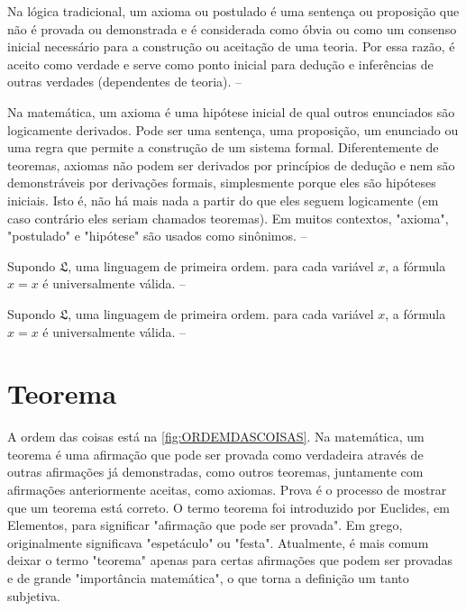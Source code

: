 Na lógica tradicional, um axioma ou postulado é uma sentença ou proposição que
não é provada ou demonstrada e é considerada como óbvia ou como um consenso
inicial necessário para a construção ou aceitação de uma teoria. Por essa
razão, é aceito como verdade e serve como ponto inicial para dedução e
inferências de outras verdades (dependentes de teoria). -- \showfont

Na matemática, um axioma é uma hipótese inicial de qual outros enunciados são
logicamente derivados. Pode ser uma sentença, uma proposição, um enunciado ou
uma regra que permite a construção de um sistema formal. Diferentemente de
teoremas, axiomas não podem ser derivados por princípios de dedução e nem são
demonstráveis por derivações formais, simplesmente porque eles são hipóteses
iniciais. Isto é, não há mais nada a partir do que eles seguem logicamente (em
caso contrário eles seriam chamados teoremas). Em muitos contextos, "axioma",
"postulado" e "hipótese" são usados como sinônimos. -- \showfont

\begin{axioma}
Supondo $\mathfrak{L}$, uma linguagem de primeira ordem. para cada variável $x$,
a fórmula $x = x$ é universalmente válida. -- \showfont
\end{axioma}

\begin{postulado}
    Supondo $\mathfrak{L}$, uma linguagem de primeira ordem. para cada variável
    $x$, a fórmula $x = x$ é universalmente válida. -- \showfont
\end{postulado}

\section{Teorema}


A ordem das coisas está na \autoref{fig:ORDEMDASCOISAS}.
Na matemática, um teorema é uma afirmação que pode ser provada como verdadeira
através de outras afirmações já demonstradas, como outros teoremas, juntamente
com afirmações anteriormente aceitas, como axiomas. Prova é o processo de
mostrar que um teorema está correto. O termo teorema foi introduzido por
Euclides, em Elementos, para significar "afirmação que pode ser provada". Em
grego, originalmente significava "espetáculo" ou "festa". Atualmente, é mais
comum deixar o termo "teorema" apenas para certas afirmações que podem ser
provadas e de grande "importância matemática", o que torna a definição um tanto
subjetiva.

